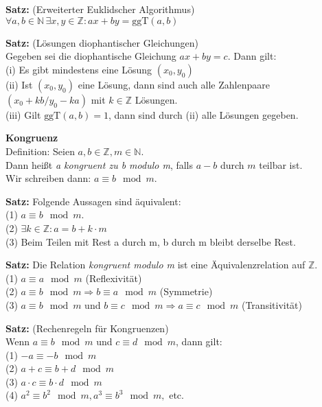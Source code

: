 \documentclass[a4paper]{article}
\newcommand{\Mod}[3]{#1\equiv#2\mod#3}
\begin{document}
\textbf{Satz:} (Erweiterter Euklidscher Algorithmus) \\
$\forall a, b \in \mathbb{N} \, \exists x, y \in \mathbb{Z}: ax + by = \text{ggT}(a,b)$
\bigskip

\textbf{Satz:} (Lösungen diophantischer Gleichungen) \\
Gegeben sei die diophantische Gleichung $ax+by=c$. Dann gilt: \\
 (i)  Es gibt mindestens eine Lösung $(x_0,y_0)$ \\
(ii) Ist $(x_0,y_0)$ eine Lösung, dann sind auch alle
Zahlenpaare $(x_0+k b/y_0-k a)$ mit $k \in \mathbb{Z}$ Lösungen. \\
(iii) Gilt $\text{ggT}(a,b) = 1$, dann sind durch (ii) alle Lösungen gegeben. 
\bigskip

\textbf{Kongruenz} \\
Definition: Seien $a, b \in \mathbb{Z} ,m \in \mathbb{N}$. \\
Dann heißt \textit{a kongruent zu b modulo m}, falls $a-b$ durch $m$ teilbar ist. \\ Wir schreiben dann: $\Mod{a}{b}{m}$.
\bigskip

\textbf{Satz:} Folgende Aussagen sind äquivalent: \\
(1) $\Mod{a}{b}{m}$. \\
(2) $\exists k \in \mathbb{Z}: a = b + k \cdot m$ \\
(3) Beim Teilen mit Rest a durch m, b durch m bleibt derselbe Rest. 
\bigskip

\textbf{Satz:} Die Relation \textit{kongruent modulo m} ist eine Äquivalenzrelation auf $\mathbb{Z}$. \\
(1) $\Mod{a}{a}{m}$ \quad (Reflexivität) \\
(2) $\Mod{a}{b}{m} \Rightarrow \Mod{b}{a}{m}$ \quad (Symmetrie) \\
(3) $\Mod{a}{b}{m}$ und $\Mod{b}{c}{m} \Rightarrow \Mod{a}{c}{m}$ \quad (Transitivität) 
\bigskip

\textbf{Satz:} (Rechenregeln für Kongruenzen) \\
Wenn  $\Mod{a}{b}{m}$ und  $\Mod{c}{d}{m}$, dann gilt: \\
(1)  $\Mod{-a}{-b}{m}$  \\
(2)  $\Mod{a+c}{b+d}{m}$ \\
(3)  $\Mod{a\cdot c}{b \cdot d}{m}$ \\
(4)  $\Mod{a^2}{b^2}{m},  \Mod{a^3}{b^3}{m},$ etc. \\

\newpage
\end{document}
